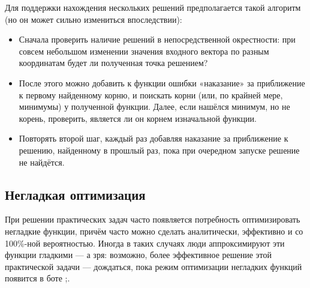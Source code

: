 \documentclass[11pt]{article}
\begin{document}
    Для поддержки нахождения нескольких решений предполагается такой алгоритм (но он может сильно измениться впоследствии):
    \begin{itemize}
        \item Сначала проверить наличие решений в непосредственной окрестности: при совсем небольшом изменении значения входного вектора
        по разным координатам будет ли полученная точка решением?
        \item После этого можно добавить к функции ошибки «наказание» за приближение к первому найденному корню, и поискать корни
        (или, по крайней мере, минимумы) у полученной функции. Далее, если нашёлся минимум, но не корень, проверить,
        является ли он корнем изначальной функции.
        \item Повторять второй шаг, каждый раз добавляя наказание за приближение к решению, найденному в прошлый раз,
        пока при очередном запуске решение не найдётся.
    \end{itemize}

    \subsection{Негладкая оптимизация}
    При решении практических задач часто появляется потребность оптимизировать негладкие функции,
    причём часто можно сделать аналитически, эффективно и со 100\%-ной вероятностью.
    Иногда в таких случаях люди аппроксимируют эти функции гладкими — а зря:
    возможно, более эффективное решение этой практической задачи — дождаться,
    пока режим оптимизации негладких функций появится в боте ;\).
\end{document}
